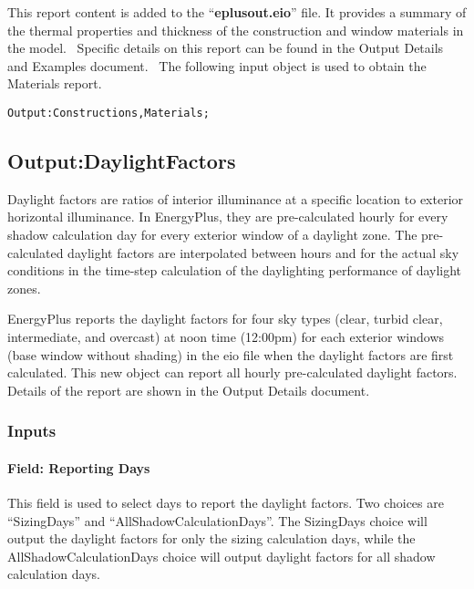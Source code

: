 This report content is added to the ``\textbf{eplusout.eio}'' file. It provides a summary of the thermal properties and thickness of the construction and window materials in the model.~ Specific details on this report can be found in the Output Details and Examples document.~ The following input object is used to obtain the Materials report.

\begin{lstlisting}
Output:Constructions,Materials;
\end{lstlisting}

\subsection{Output:DaylightFactors}\label{outputdaylightfactors}

Daylight factors are ratios of interior illuminance at a specific location to exterior horizontal illuminance. In EnergyPlus, they are pre-calculated hourly for every shadow calculation day for every exterior window of a daylight zone. The pre-calculated daylight factors are interpolated between hours and for the actual sky conditions in the time-step calculation of the daylighting performance of daylight zones.

EnergyPlus reports the daylight factors for four sky types (clear, turbid clear, intermediate, and overcast) at noon time (12:00pm) for each exterior windows (base window without shading) in the eio file when the daylight factors are first calculated. This new object can report all hourly pre-calculated daylight factors. Details of the report are shown in the Output Details document.

\subsubsection{Inputs}\label{inputs-4-027}

\paragraph{Field: Reporting Days}\label{field-reporting-days}

This field is used to select days to report the daylight factors. Two choices are ``SizingDays'' and ``AllShadowCalculationDays''. The SizingDays choice will output the daylight factors for only the sizing calculation days, while the AllShadowCalculationDays choice will output daylight factors for all shadow calculation days.

